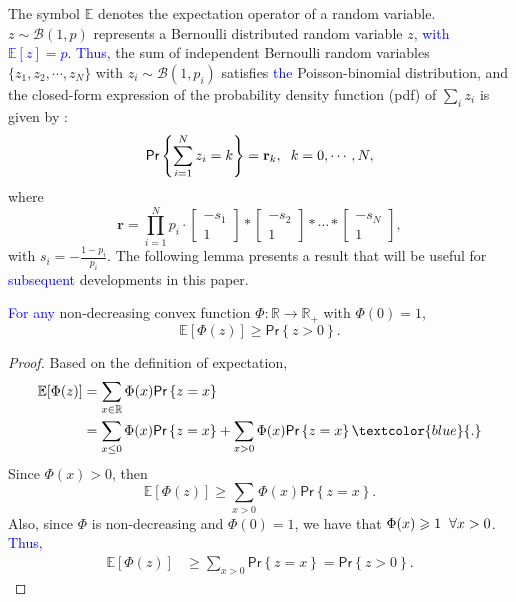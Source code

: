 \noindent The symbol $\mathbb{E}$ denotes the expectation operator of a random variable. $z \sim \mathcal{B}(1,p)$ represents a Bernoulli distributed random variable $z$\textcolor{blue}{, with $\mathbb{E}[z]=p$. Thus,} the sum of independent Bernoulli random variables $\{z_1,z_2,\cdots,z_N\}$ with $z_i \sim \mathcal{B}(1,p_i)$ satisfies \textcolor{blue}{the} Poisson-binomial distribution, and the closed-form expression of the probability density function (pdf) of $\sum_i z_i$ is given by \cite{fernandez2010closed}:
  \begin{equation}\label{equ:PMF}
      \textsf{Pr}\left\{\sum_{i=1}^{N} z_{i} = k \right\}=\mathbf{r}_k,\hspace{2mm} k=0,\cdots,N,
  \end{equation}
where
\begin{equation} \label{equ:pdf_r}
     \mathbf{r} = \displaystyle\prod_{i=1}^{N} p_{i} \cdot \begin{bmatrix}-s_1\\1 \end{bmatrix} * \begin{bmatrix}-s_2\\1 \end{bmatrix} * \cdots * \begin{bmatrix}-s_{N}\\1 \end{bmatrix},
\end{equation}
with $s_i = -\frac{1-p_{i}}{p_{i}}$. The following lemma presents a result that will be useful for \textcolor{blue}{subsequent} developments in this paper.
\begin{lemma}\label{Lem:chance_constrain}
\textcolor{blue}{For any} non-decreasing convex function $\Phi:\mathbb{R} \rightarrow \mathbb{R}_{+}$ with $\Phi(0) = 1$, $$\mathbb{E}[\Phi(z)] \geq \textsf{Pr}\left\{z>0\right\}.$$
\end{lemma}
\begin{proof}
Based on the definition of expectation, 
\begin{align*}
\mathbb{E}[\Phi(z)] &= \sum\limits_{x \in \mathbb{R}}\Phi(x)\textsf{Pr}\left\{z =x\right\}\\
 &= \sum_{x\leq 0}\Phi(x)\textsf{Pr}\left\{z =x\right\} +\sum_{x> 0}\Phi(x)\textsf{Pr}\left\{z =x\right\}\textcolor{blue}{.}
\end{align*}
Since $\Phi(x)>0$, then 
$$\mathbb{E}[\Phi(z)] \geq \sum_{x> 0}\Phi(x)\textsf{Pr}\left\{z =x\right\}.$$ Also, since $\Phi$ is non-decreasing and $\Phi(0)=1$, we have that \textcolor{blue}{$\Phi(x) \geqslant 1 \hspace{2mm} \forall x>0$. Thus, }
\begin{align*}
    \mathbb{E}[\Phi(z)] &\geq \sum_{x> 0}\textsf{Pr}\left\{z =x\right\} = \textsf{Pr}\left\{z>0\right\}.
\end{align*}

\end{proof}

